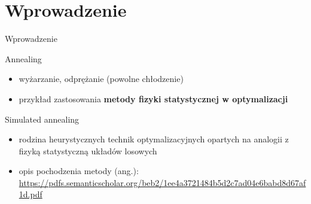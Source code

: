 \section{Wprowadzenie}
	\begin{frame}{Wprowadzenie}
		\begin{block}{Annealing}
			\begin{itemize}
				\item wyżarzanie, odprężanie (powolne chłodzenie)	
				\item przykład zastosowania \textbf{metody fizyki statystycznej w optymalizacji} \cite{kirkpatrick}
			\end{itemize}
		\end{block}
	
		\begin{block}{Simulated annealing}
			\begin{itemize}
				\item rodzina heurystycznych technik optymalizacyjnych opartych na analogii z fizyką statystyczną układów losowych 
				\item opis pochodzenia metody (ang.): \url{https://pdfs.semanticscholar.org/beb2/1ee4a3721484b5d2c7ad04e6babd8d67af1d.pdf}
			\end{itemize}
		\end{block}	
	\end{frame}